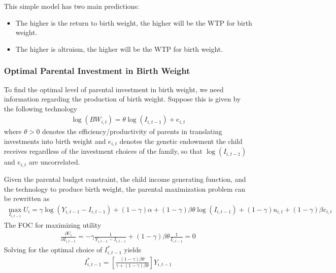 \documentclass[a4paper, 11pt]{article}
\begin{document}
\begin{spacing}{1.4}
 

This simple model has two main predictions:
\begin{itemize}
  \item The higher is the return to birth weight, the higher will be the WTP for birth weight.
  \item The higher is altruism, the higher will be the WTP for birth weight.
\end{itemize}

\subsubsection{Optimal Parental Investment in Birth Weight}
To find the optimal level of parental investment in birth weight, we need information regarding the production of birth weight. Suppose this is given by the following technology
\begin{align*}
\log(BW_{i,t}) = \theta \log(I_{i,t-1}) + e_{i,t}
\end{align*}
where $\theta >0$ denotes the efficiency/productivity of parents in translating investments into birth weight and  $e_{i,t}$ denotes the genetic endowment the child receives regardless of the investment choices of the family, so that $\log(I_{i,t-1})$ and $e_{i,t}$ are uncorrelated.%

Given the parental budget constraint, the child income generating function, and the technology to produce birth weight, the parental maximization problem can be rewritten as
\begin{align*}
\max_{ I_{i,t-1}}  U_i = \gamma \log(Y_{i,t-1} - I_{i,t-1}) + (1-\gamma) \alpha + (1-\gamma) \beta \theta  \log(I_{i,t-1}) + (1-\gamma) u_{i,t} + (1-\gamma) \beta e_{i,t}
\end{align*}
The FOC for maximizing utility
\begin{align*}
\frac{\partial U_i}{\partial I_{i,t-1}} = -\gamma\frac{1}{Y_{i,t-1} - I_{i,t-1}}  + (1 - \gamma) \beta \theta \frac{1}{I_{i,t-1}} = 0
\end{align*}%
Solving for the optimal choice of $I_{i,t-1}^*$ yields
\begin{align}\label{INV}
I_{i,t-1}^* = \left[\frac{(1-\gamma) \beta \theta}{\gamma + (1-\gamma) \beta \theta} \right]Y_{i,t-1}
\end{align}


\end{spacing}
\end{document}
